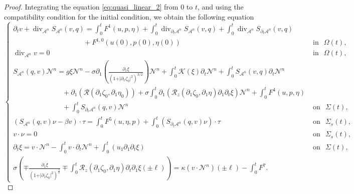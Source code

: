 \documentclass[letterpaper,reqno,10pt,twoside]{amsart}
\theoremstyle{definition}
\theoremstyle{remark}
\def\p{\partial}
\begin{document}
	\begin{proof}
		Integrating the equation \eqref{eq:quasi_linear_2} from $0$ to $t$, and using the compatibility condition for the initial condition, we obtain the following equation
		\begin{equation}\label{eq:quasi_linear_3}
			\begin{cases}
				\partial_{t}v+\operatorname{div}_{\mathcal{A}^{n}}S_{\mathcal{A}^{n}}(v,q)=\int_{0}^{t}F^{1}(u,p,\eta)+\int_0^{t}\operatorname{div}_{\p_{t}\mathcal{A}^{n}}S_{\mathcal{A}^{n}}(v,q)+\int_0^{t}\operatorname{div}_{\mathcal{A}^{n}}S_{\p_{t}\mathcal{A}^{n}}(v,q)\\
				\qquad\qquad\qquad\qquad\qquad+F^{1,0}(u(0),p(0),\eta(0))~~~&\operatorname{in}~~\Omega(t),\\
				\operatorname{div}_{\mathcal{A}^{n}}v=0~~~&\operatorname{in}~~\Omega(t),\\
				S_{\mathcal{A}^{n}}(q,v)\mathcal{N}^{n}=g\xi\mathcal{N}^{n}-\sigma\partial_{1}\left(\frac{\p_1\xi}{ (1+\vert \partial_{1}\zeta_{0}\vert^{2})^{3/2}} \right)\mathcal{N}^{n}+\int_{0}^{t}\mathcal{K}(\xi)\p_{t}\mathcal{N}^{n}+\int_{0}^{t}S_{\mathcal{A}^{n}}(v,q)\p_{t}\mathcal{N}^{n}\\
				\quad\quad\quad\quad\quad\quad\quad +\p_{1}(\mathcal{R}(\p_{1}\zeta_{0},\p_{1}\eta_{0}))+\sigma\int_{0}^{t}\partial_{1}(\mathcal{R}_{z}(\partial_{1}\zeta_{0},\partial_{1}\eta)\partial_{1}\partial_{t}\xi)\mathcal{N}^{n}+\int_{0}^{t}F^{4}(u,p,\eta)\\
				\quad\quad\quad\quad\quad\quad\quad +\int_{0}^{t}S_{\p_{t}\mathcal{A}^{n}}(q,v)\mathcal{N}^{n}~~~&\operatorname{on}~~\Sigma(t),\\
				(S_{\mathcal{A}^{n}}(q,v)\nu-\beta v)\cdot \tau=\int_{0}^{t}F^{5}(u,\eta,p)+\int_{0}^{t}(S_{\p_{t}\mathcal{A}^{n}}(q,v)\nu)\cdot \tau~~~&\operatorname{on}~~\Sigma_{s}(t),\\
				v\cdot \nu=0~~~&\operatorname{on}~~\Sigma_{s}(t),\\
				\partial_{t}\xi=v\cdot \mathcal{N}^{n}-\int_{0}^{t}v\cdot \p_{t}\mathcal{N}^{n}+\int_{0}^{t}(u_{1}\p_{1}\p_{t}\xi)~~~&\operatorname{on}~~\Sigma(t),\\
				\sigma(\mp \frac{\partial_{1}\xi}{(1+\vert \partial_{1}\zeta_{0}\vert^{2})^{\frac{3}{2}}}\mp\int_{0}^{t}\mathcal{R}_{z}(\partial_{1}\zeta_{0},\partial_{1}\eta)\partial_{t}\partial_{1}\xi(\pm \ell))
				=\kappa (v\cdot \mathcal{N}^{n})(\pm \ell)-\int_{0}^{t}{F}^{7}.
			\end{cases}
		\end{equation}
		

\end{proof}
\end{document}
